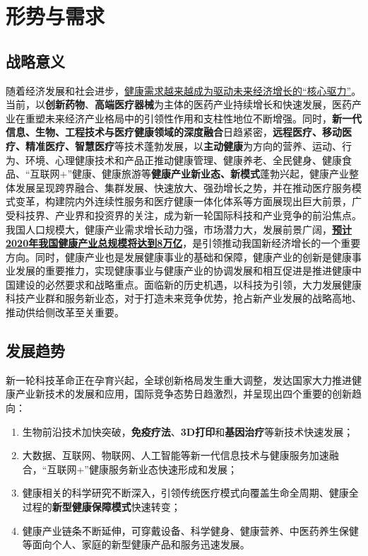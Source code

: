 \documentclass{article}
\begin{document}
\section{形势与需求}

\subsection{战略意义}

随着经济发展和社会进步，\uline{健康需求越来越成为驱动未来经济增长的“核心驱力”}。当前，以\textbf{创新药物}、\textbf{高端医疗器械}为主体的医药产业持续增长和快速发展，医药产业在重塑未来经济产业格局中的引领性作用和支柱性地位不断增强。同时，\textbf{新一代信息、生物、工程技术与医疗健康领域的深度融合}日趋紧密，\textbf{远程医疗、移动医疗、精准医疗、智慧医疗}等技术蓬勃发展，以\textbf{主动健康}为方向的营养、运动、行为、环境、心理健康技术和产品正推动健康管理、健康养老、全民健身、健康食品、“互联网+”健康、健康旅游等\textbf{健康产业新业态、新模式}蓬勃兴起，健康产业整体发展呈现跨界融合、集群发展、快速放大、强劲增长之势，并在推动医疗服务模式变革，构建院内外连续性服务和医疗健康一体化体系等方面展现出巨大前景，广受科技界、产业界和投资界的关注，成为新一轮国际科技和产业竞争的前沿焦点。我国人口规模大，健康产业需求增长动力强，市场潜力大，发展前景广阔，\textbf{\uline{预计2020年我国健康产业总规模将达到8万亿}}，是引领推动我国新经济增长的一个重要方向。同时，健康产业也是发展健康事业的基础和保障，健康产业的创新是健康事业发展的重要推力，实现健康事业与健康产业的协调发展和相互促进是推进健康中国建设的必然要求和战略重点。面临新的历史机遇，以科技为引领，大力发展健康科技产业群和服务新业态，对于打造未来竞争优势，抢占新产业发展的战略高地、推动供给侧改革至关重要。

\subsection{发展趋势}

新一轮科技革命正在孕育兴起，全球创新格局发生重大调整，发达国家大力推进健康产业新技术的发展和应用，国际竞争态势日趋激烈，并呈现出四个重要的创新趋向：

\begin{enumerate}
	\item 生物前沿技术加快突破，\textbf{免疫疗法}、\textbf{3D打印}和\textbf{基因治疗}等新技术快速发展；
	\item 大数据、互联网、物联网、人工智能等新一代信息技术与健康服务加速融合，“互联网+”健康服务新业态快速形成和发展；
	\item 健康相关的科学研究不断深入，引领传统医疗模式向覆盖生命全周期、健康全过程的\textbf{新型健康保障模式}快速转变；
	\item 健康产业链条不断延伸，可穿戴设备、科学健身、健康营养、中医药养生保健等面向个人、家庭的新型健康产品和服务迅速发展。
\end{enumerate}
\end{document}
